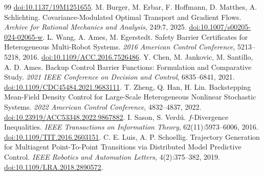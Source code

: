 \documentclass[UTF8,a4paper,11pt,fontset=none]{ctexart}
\begin{document}
\begin{thebibliography}{99}
\href{https://doi.org/10.1137/19M1251655}{doi:10.1137/19M1251655}.
 M. Burger, M. Erbar, F. Hoffmann, D. Matthes, A. Schlichting.
Covariance-Modulated Optimal Transport and Gradient Flows.
\emph{Archive for Rational Mechanics and Analysis}, 249:7, 2025.
\href{https://doi.org/10.1007/s00205-024-02065-w}{doi:10.1007/s00205-024-02065-w}.
 L. Wang, A. Ames, M. Egerstedt.
Safety Barrier Certificates for Heterogeneous Multi-Robot Systems.
\emph{2016 American Control Conference}, 5213--5218, 2016.
\href{https://doi.org/10.1109/ACC.2016.7526486}{doi:10.1109/ACC.2016.7526486}.
 Y. Chen, M. Jankovic, M. Santillo, A. D. Ames.
Backup Control Barrier Functions: Formulation and Comparative Study.
\emph{2021 IEEE Conference on Decision and Control}, 6835--6841, 2021.
\href{https://doi.org/10.1109/CDC45484.2021.9683111}{doi:10.1109/CDC45484.2021.9683111}.
 T. Zheng, Q. Han, H. Lin.
Backstepping Mean-Field Density Control for Large-Scale Heterogeneous Nonlinear Stochastic Systems.
\emph{2022 American Control Conference}, 4832--4837, 2022.
\href{https://doi.org/10.23919/ACC53348.2022.9867882}{doi:10.23919/ACC53348.2022.9867882}.
 I. Sason, S. Verd\'u.
$f$-Divergence Inequalities.
\emph{IEEE Transactions on Information Theory}, 62(11):5973--6006, 2016.
\href{https://doi.org/10.1109/TIT.2016.2603151}{doi:10.1109/TIT.2016.2603151}.
 C. E. Luis, A. P. Schoellig.
Trajectory Generation for Multiagent Point-To-Point Transitions via Distributed Model Predictive Control.
\emph{IEEE Robotics and Automation Letters}, 4(2):375--382, 2019.
\href{https://doi.org/10.1109/LRA.2018.2890572}{doi:10.1109/LRA.2018.2890572}.
\end{thebibliography}
\end{document}
